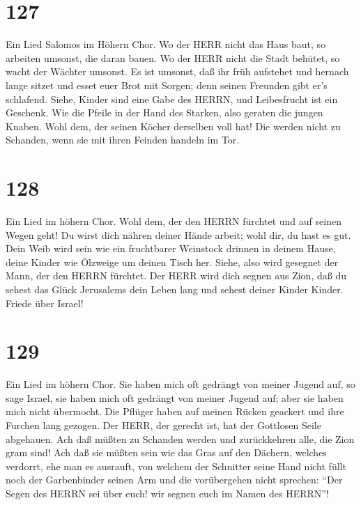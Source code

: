 \hypertarget{section-126}{%
\section{127}\label{section-126}}

 Ein Lied Salomos im Höhern Chor. Wo der HERR nicht das Haus
baut, so arbeiten umsonst, die daran bauen. Wo der HERR nicht die Stadt
behütet, so wacht der Wächter umsonst.  Es ist umsonst, daß
ihr früh aufstehet und hernach lange sitzet und esset euer Brot mit
Sorgen; denn seinen Freunden gibt er's schlafend.  Siehe,
Kinder sind eine Gabe des HERRN, und Leibesfrucht ist ein Geschenk.
 Wie die Pfeile in der Hand des Starken, also geraten die
jungen Knaben.  Wohl dem, der seinen Köcher derselben voll
hat! Die werden nicht zu Schanden, wenn sie mit ihren Feinden handeln im
Tor.

\hypertarget{section-127}{%
\section{128}\label{section-127}}

 Ein Lied im höhern Chor. Wohl dem, der den HERRN fürchtet
und auf seinen Wegen geht!  Du wirst dich nähren deiner
Hände arbeit; wohl dir, du hast es gut.  Dein Weib wird sein
wie ein fruchtbarer Weinstock drinnen in deinem Hause, deine Kinder wie
Ölzweige um deinen Tisch her.  Siehe, also wird gesegnet der
Mann, der den HERRN fürchtet.  Der HERR wird dich segnen aus
Zion, daß du sehest das Glück Jerusalems dein Leben lang 
und sehest deiner Kinder Kinder. Friede über Israel!

\hypertarget{section-128}{%
\section{129}\label{section-128}}

 Ein Lied im höhern Chor. Sie haben mich oft gedrängt von
meiner Jugend auf, so sage Israel,  sie haben mich oft
gedrängt von meiner Jugend auf; aber sie haben mich nicht übermocht.
 Die Pflüger haben auf meinen Rücken geackert und ihre
Furchen lang gezogen.  Der HERR, der gerecht ist, hat der
Gottlosen Seile abgehauen.  Ach daß müßten zu Schanden
werden und zurückkehren alle, die Zion gram sind!  Ach daß
sie müßten sein wie das Gras auf den Dächern, welches verdorrt, ehe man
es ausrauft,  von welchem der Schnitter seine Hand nicht
füllt noch der Garbenbinder seinen Arm  und die vorübergehen
nicht sprechen: ``Der Segen des HERRN sei über euch! wir segnen euch im
Namen des HERRN''!


